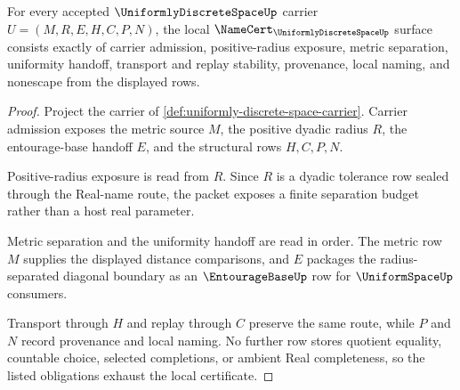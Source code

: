 \begin{theorem}
\label{thm:uniformly-discrete-space-namecert-obligations}
For every accepted $\UniformlyDiscreteSpaceUp$ carrier $U=(M,R,E,H,C,P,N)$, the local $\NameCert_{\UniformlyDiscreteSpaceUp}$ surface consists exactly of carrier admission, positive-radius exposure, metric separation, uniformity handoff, transport and replay stability, provenance, local naming, and nonescape from the displayed rows.
\end{theorem}
\begin{proof}
Project the carrier of \autoref{def:uniformly-discrete-space-carrier}. Carrier admission exposes the metric source $M$, the positive dyadic radius $R$, the entourage-base handoff $E$, and the structural rows $H,C,P,N$.

Positive-radius exposure is read from $R$. Since $R$ is a dyadic tolerance row sealed through the Real-name route, the packet exposes a finite separation budget rather than a host real parameter.

Metric separation and the uniformity handoff are read in order. The metric row $M$ supplies the displayed distance comparisons, and $E$ packages the radius-separated diagonal boundary as an $\EntourageBaseUp$ row for $\UniformSpaceUp$ consumers.

Transport through $H$ and replay through $C$ preserve the same route, while $P$ and $N$ record provenance and local naming. No further row stores quotient equality, countable choice, selected completions, or ambient Real completeness, so the listed obligations exhaust the local certificate.
\end{proof}

